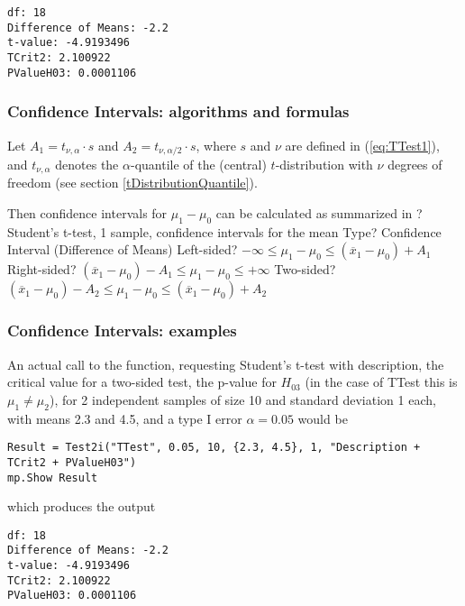 \begin{verbatim}
df: 18
Difference of Means: -2.2
t-value: -4.9193496
TCrit2: 2.100922
PValueH03: 0.0001106
\end{verbatim}




\subsubsection{Confidence Intervals: algorithms and formulas}
\label{1SampleTTest_CI}

Let $A_1=t_{\nu,\alpha} \cdot s$ and $A_2=t_{\nu,\alpha/2} \cdot s$, where $s$ and $\nu$ are defined in (\ref{eq:TTest1}), and $t_{\nu,\alpha}$ denotes the $\alpha$-quantile of the (central) $t$-distribution with $\nu$ degrees of freedom (see section \ref{tDistributionQuantile}). 


\mpTableTwoColsThreeRows
{Then confidence intervals for $\mu_1 - \mu_0$ can be calculated as summarized in ? Student's t-test, 1 sample, confidence intervals for the mean}
{Type? Confidence Interval (Difference of Means)}
{Left-sided? $-\infty \leq \mu_1 - \mu_0 \leq (\overline{x}_1-\mu_0)  + A_1$}
{Right-sided? $(\overline{x}_1-\mu_0 ) - A_1 \leq \mu_1 - \mu_0 \leq +\infty$}
{Two-sided? $(\overline{x}_1-\mu_0 ) - A_2 \leq \mu_1 - \mu_0 \leq (\overline{x}_1-\mu_0 ) + A_2$}



\subsubsection{Confidence Intervals: examples}
An actual call to the function, requesting Student's t-test with description, the critical value for a two-sided test, the p-value for $H_{03}$ (in the case of \textsf{TTest} this is $\mu_1 \neq \mu_2$), for 2 independent samples of size 10 and standard deviation 1 each, with means 2.3 and 4.5, and a type I error $\alpha=0.05$ would be

\begin{lstlisting}
Result = Test2i("TTest", 0.05, 10, {2.3, 4.5}, 1, "Description + TCrit2 + PValueH03")
mp.Show Result
\end{lstlisting}
which produces the output

\begin{verbatim}
df: 18
Difference of Means: -2.2
t-value: -4.9193496
TCrit2: 2.100922
PValueH03: 0.0001106
\end{verbatim}





